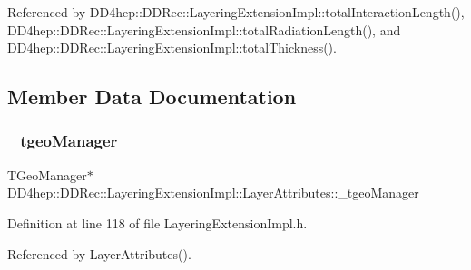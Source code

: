 Referenced by D\+D4hep\+::\+D\+D\+Rec\+::\+Layering\+Extension\+Impl\+::total\+Interaction\+Length(), D\+D4hep\+::\+D\+D\+Rec\+::\+Layering\+Extension\+Impl\+::total\+Radiation\+Length(), and D\+D4hep\+::\+D\+D\+Rec\+::\+Layering\+Extension\+Impl\+::total\+Thickness().



\subsection{Member Data Documentation}
\hypertarget{struct_d_d4hep_1_1_d_d_rec_1_1_layering_extension_impl_1_1_layer_attributes_a14263508e7633f4d41ea796eea116f1e}{}\label{struct_d_d4hep_1_1_d_d_rec_1_1_layering_extension_impl_1_1_layer_attributes_a14263508e7633f4d41ea796eea116f1e} 
\subsubsection{\texorpdfstring{\+\_\+tgeo\+Manager}{\_tgeoManager}}
{\footnotesize\ttfamily T\+Geo\+Manager$\ast$ D\+D4hep\+::\+D\+D\+Rec\+::\+Layering\+Extension\+Impl\+::\+Layer\+Attributes\+::\+\_\+tgeo\+Manager\hspace{0.3cm}{\ttfamily [private]}}



Definition at line 118 of file Layering\+Extension\+Impl.\+h.



Referenced by Layer\+Attributes().

\hypertarget{struct_d_d4hep_1_1_d_d_rec_1_1_layering_extension_impl_1_1_layer_attributes_a9c544a56690f13249e4cfb943fb9d11e}{}\label{struct_d_d4hep_1_1_d_d_rec_1_1_layering_extension_impl_1_1_layer_attributes_a9c544a56690f13249e4cfb943fb9d11e} 
